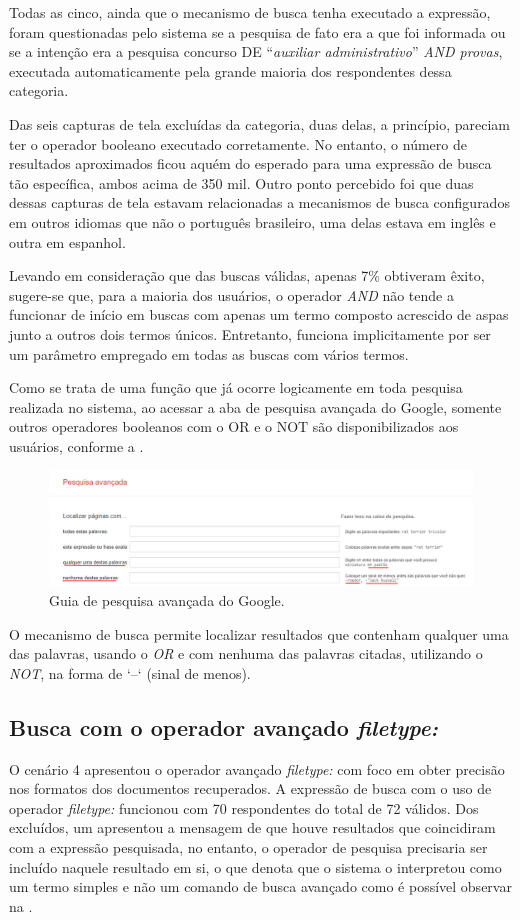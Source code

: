 \documentclass[portuguese]{textolivre}
\begin{document}
Todas as cinco, ainda que o mecanismo de busca tenha executado a expressão, foram questionadas pelo sistema se a pesquisa de fato era a que foi informada ou se a intenção era a pesquisa concurso DE “\textit{auxiliar administrativo}” \textit{AND provas}, executada automaticamente pela grande maioria dos respondentes dessa categoria.

Das seis capturas de tela excluídas da categoria, duas delas, a princípio, pareciam ter o operador booleano executado corretamente. No entanto, o número de resultados aproximados ficou aquém do esperado para uma expressão de busca tão específica, ambos acima de 350 mil. Outro ponto percebido foi que duas dessas capturas de tela estavam relacionadas a mecanismos de busca configurados em outros idiomas que não o português brasileiro, uma delas estava em inglês e outra em espanhol.

Levando em consideração que das buscas válidas, apenas 7\% obtiveram êxito, sugere-se que, para a maioria dos usuários, o operador \textit{AND} não tende a funcionar de início em buscas com apenas um termo composto acrescido de aspas junto a outros dois termos únicos. Entretanto, funciona implicitamente por ser um parâmetro empregado em todas as buscas com vários termos.

Como se trata de uma função que já ocorre logicamente em toda pesquisa realizada no sistema, ao acessar a aba de pesquisa avançada do Google, somente outros operadores booleanos com o OR e o NOT são disponibilizados aos usuários, conforme a .

\begin{figure}[h!]
    \centering
    \includegraphics[width=0.8\linewidth]{fig-014.png}
    \caption{Guia de pesquisa avançada do Google.}
    \label{fig18}
\end{figure}

O mecanismo de busca permite localizar resultados que contenham qualquer uma das palavras, usando o \textit{OR} e com nenhuma das palavras citadas, utilizando o \textit{NOT}, na forma de ‘–‘ (sinal de menos).

\subsection{Busca com o operador avançado \textit{filetype:}}\label{sec-format-simple}
O cenário 4 apresentou o operador avançado \textit{filetype:} com foco em obter precisão nos formatos dos documentos recuperados. A expressão de busca com o uso de operador \textit{filetype:} funcionou com 70 respondentes do total de 72 válidos. Dos excluídos, um apresentou a mensagem de que houve resultados que coincidiram com a expressão pesquisada, no entanto, o operador de pesquisa precisaria ser incluído naquele resultado em si, o que denota que o sistema o interpretou como um termo simples e não um comando de busca avançado como é possível observar na .
\end{document}
